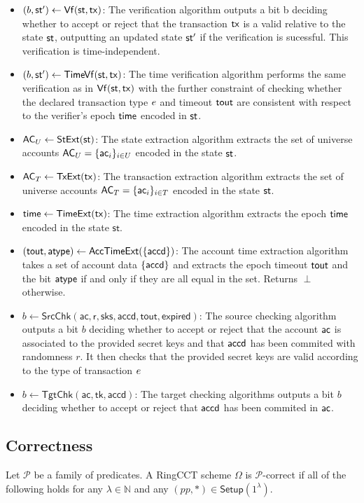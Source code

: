 \begin{definition}
\begin{itemize}
        \item $(b,\st') \gets \mathsf{Vf}(\st,\tx)$: The verification algorithm outputs a bit b deciding whether to accept or reject that the transaction $\mathsf{tx}$ is a valid relative to the state $\st$, outputting an updated state $\st'$ if the verification is sucessful. This verification is time-independent.
        \item $(b,\mathsf{st}') \gets \mathsf{TimeVf}(\st,\tx)$: The time verification algorithm performs the same verification as in $\mathsf{Vf}(\st, \tx)$ with the further constraint of checking whether the declared transaction type $e$ and timeout $\mathsf{tout}$ are consistent with respect to the verifier's epoch $\mathsf{time}$ encoded in $\st$.
        \item $\mathsf{AC}_U \gets \mathsf{StExt}(\st)$: The state extraction algorithm
        extracts the set of universe accounts $\mathsf{AC}_U = \{\mathsf{ac}_i\}_{i \in U}$ encoded in the state $\st$.
        \item $\mathsf{AC}_T \gets \mathsf{TxExt}(\mathsf{tx})$: The transaction extraction algorithm
        extracts the set of universe accounts $\mathsf{AC}_T = \{\mathsf{ac}_i\}_{i \in T}$ encoded in the state $\st$.
        \item $\mathsf{time} \gets \mathsf{TimeExt}(\mathsf{tx})$: The time extraction algorithm
        extracts the epoch $\mathsf{time}$ encoded in the state $\mathsf{st}$.
        \item $(\mathsf{tout}, \mathsf{atype}) \gets \mathsf{AccTimeExt}(\{\mathsf{accd}\})$: The account time extraction algorithm takes a set of account data $\{\mathsf{accd}\}$ and extracts the epoch timeout $\mathsf{tout}$ and the bit $\mathsf{atype}$ if and only if they are all equal in the set. Returns $\perp$ otherwise.
        \item $b \gets \mathsf{SrcChk}(\mathsf{ac,r,sks,accd,tout,expired})$: The source checking algorithm outputs a bit $b$ deciding whether to accept or reject that the account $\mathsf{ac}$ is associated to the provided secret keys and that $\mathsf{accd}$ has been commited with randomness $r$. It then checks that the provided secret keys are valid according to the type of transaction $e$
        \item $b \gets \mathsf{TgtChk}(\mathsf{ac, tk, accd})$: The target checking algorithms outputs a bit $b$ deciding whether to accept or reject that $\mathsf{accd}$ has been commited in $\mathsf{ac}$. 
    \end{itemize}
\end{definition}

\subsection{Correctness}
\begin{definition}[Correctness] 
    Let $\mathcal{P}$ be a family of predicates. A RingCCT scheme $\Omega$ is $\mathcal{P}$-correct if all of the following holds for any $\lambda \in \mathbb{N}$ and any $(pp, *) \in \mathsf{Setup}(1^\lambda)$.
\end{definition}


